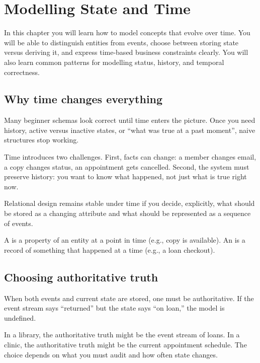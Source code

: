 \chapter{Modelling State and Time}

\begin{learningobjectives}
In this chapter you will learn how to model concepts that evolve over time.
You will be able to distinguish entities from events, choose between storing state versus deriving it, and express time-based business constraints clearly.
You will also learn common patterns for modelling status, history, and temporal correctness.
\end{learningobjectives}

\section{Why time changes everything}
Many beginner schemas look correct until time enters the picture.
Once you need history, active versus inactive states, or “what was true at a past moment”, naive structures stop working.

Time introduces two challenges.
First, facts can change: a member changes email, a copy changes status, an appointment gets cancelled.
Second, the system must preserve history: you want to know what happened, not just what is true right now.

Relational design remains stable under time if you decide, explicitly, what should be stored as a changing attribute and what should be represented as a sequence of events.

\begin{definitionbox}
A  is a property of an entity at a point in time (e.g., copy is available).
An  is a record of something that happened at a time (e.g., a loan checkout).
\end{definitionbox}

\section{Choosing authoritative truth}
When both events and current state are stored, one must be authoritative.
If the event stream says “returned” but the state says “on loan,” the model is undefined.

In a library, the authoritative truth might be the event stream of loans.
In a clinic, the authoritative truth might be the current appointment schedule.
The choice depends on what you must audit and how often state changes.

